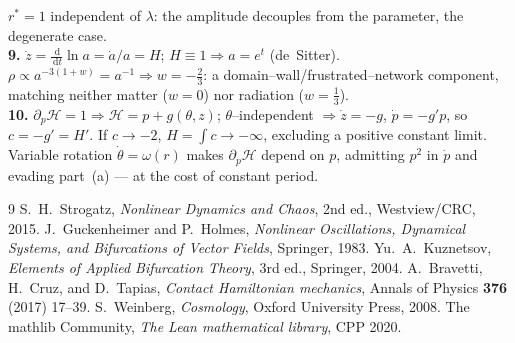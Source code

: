 \documentclass[11pt]{article}
\theoremstyle{plain}
\theoremstyle{definition}
\newcommand{\dd}{\,\mathrm{d}}
\begin{document}
$r^\ast=1$ independent of $\lambda$: the amplitude decouples from the parameter,
the degenerate case.\\[2pt]
\textbf{9.} $\dot z=\frac{\dd}{\dd t}\ln a=\dot a/a=H$; $H\equiv1\Rightarrow
a=e^t$ (de~Sitter). $\rho\propto a^{-3(1+w)}=a^{-1}\Rightarrow w=-\tfrac23$:
a domain--wall/frustrated--network component, matching neither matter
($w=0$) nor radiation ($w=\tfrac13$).\\[2pt]
\textbf{10.} $\partial_p\mathcal H=1\Rightarrow\mathcal H=p+g(\theta,z)$;
$\theta$--independent $\Rightarrow\dot z=-g$, $\dot p=-g'p$, so
$c=-g'=H'$. If $c\to-2$, $H=\int c\to-\infty$, excluding a positive constant
limit. Variable rotation $\dot\theta=\omega(r)$ makes $\partial_p\mathcal H$
depend on $p$, admitting $p^2$ in $\dot p$ and evading part~(a) --- at the cost
of constant period.

\begin{thebibliography}{9}
 S.~H.~Strogatz, \emph{Nonlinear Dynamics and Chaos},
2nd ed., Westview/CRC, 2015.
 J.~Guckenheimer and P.~Holmes,
\emph{Nonlinear Oscillations, Dynamical Systems, and Bifurcations of Vector
Fields}, Springer, 1983.
 Yu.~A.~Kuznetsov, \emph{Elements of Applied Bifurcation
Theory}, 3rd ed., Springer, 2004.
 A.~Bravetti, H.~Cruz, and D.~Tapias,
\emph{Contact Hamiltonian mechanics}, Annals of Physics \textbf{376} (2017)
17--39.
 S.~Weinberg, \emph{Cosmology}, Oxford University Press,
2008.
 The mathlib Community, \emph{The Lean mathematical library},
CPP 2020.
\end{thebibliography}
\end{document}
